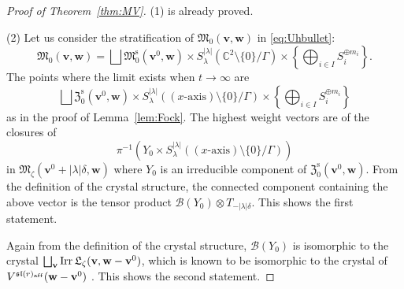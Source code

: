 \documentclass[10pt,a4paper]{amsart}
\theoremstyle{definition}
\numberwithin{equation}{section}
\newcommand{\thmref}[1]{Theorem~\ref{#1}}
\newcommand{\lemref}[1]{Lemma~\ref{#1}}
\newcommand{\C}{{\mathbb C}}
\newcommand{\algsl}{\operatorname{\mathfrak{sl}}} %
\newcommand{\M}{{\mathfrak M}} %
\newcommand{\Mreg}{\M^{\operatorname{s}}}
\newcommand{\La}{{\mathfrak L}} %
\newcommand{\bv}{{\mathbf v}} %
\newcommand{\bw}{{\mathbf w}} %
\newcommand{\Irr}{\operatorname{Irr}}
\newcommand{\aff}{\mathrm{af\/f}}
\begin{document}
\begin{proof}[Proof of \thmref{thm:MV}]
(1) is already proved.

(2) Let us consider the stratif\/ication of
$\M_0(\bv,\bw)$ in \eqref{eq:Uhbullet}:
\begin{equation*}
  \M_0(\bv,\bw) = \bigsqcup
  \Mreg_0(\bv^0,\bw)
  \times S^{|\lambda|}_\lambda(\C^2\setminus\{0\}/\Gamma)
  \times \left\{
    \bigoplus_{i\in I} S_i^{\oplus m_i}
    \right\}.
\end{equation*}
The points where the limit exists when $t\to \infty$ are
\begin{equation*}
  \bigsqcup
  \mathfrak Z^{\operatorname{s}}_0(\bv^0,\bw)
  \times S^{|\lambda|}_\lambda((\text{$x$-axis})\setminus\{0\}/\Gamma)
  \times \left\{
    \bigoplus_{i\in I} S_i^{\oplus m_i}
    \right\}
\end{equation*}
as in the proof of \lemref{lem:Fock}. The highest weight vectors are
of the closures of
\begin{equation*}
   \pi^{-1}(
   Y_0 \times
   S^{|\lambda|}_\lambda((\text{$x$-axis})\setminus\{0\}/\Gamma))
\end{equation*}
in $\M_\zeta(\bv^0+|\lambda|\delta,\bw)$ where $Y_0$ is an irreducible
component of $\mathfrak Z^{\operatorname{s}}_0(\bv^0,\bw)$.
%
From the def\/inition of the crystal structure, the connected component
containing the above vector is the tensor product
\(
   \mathscr B(Y_0) \otimes T_{-|\lambda|\delta}.
\)
This shows the f\/irst statement.

Again from the def\/inition of the crystal structure, $\mathscr B(Y_0)$
is isomorphic to the crystal $\bigsqcup_\bv \linebreak[3]\Irr\La_\zeta(\bv,\bw -
\bv^0)$, which is known to be isomorphic to the crystal of
$V^{\algsl(r)_\aff}(\bw - \bv^0)$ \cite{KS,Saito,Na-tensor}. This shows
  the second statement.
\end{proof}
\end{document}

